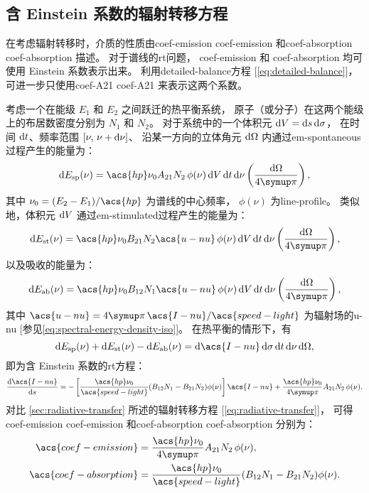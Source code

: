 \subsection{含 Einstein 系数的辐射转移方程}

在考虑辐射转移时，介质的性质由\acl{coef-emission} \acs{coef-emission}
和\acl{coef-absorption} \acs{coef-absorption} 描述。
对于谱线的\ac{rt}问题，
\acs{coef-emission} 和 \acs{coef-absorption} 均可使用 Einstein 系数表示出来。
利用\ac{detailed-balance}方程 [\autoref{eq:detailed-balance}]，
可进一步只使用\acl{coef-A21} \ac{coef-A21} 来表示这两个系数。

考虑一个在能级 $E_1$ 和 $E_2$ 之间跃迁的热平衡系统，
原子（或分子）在这两个能级上的布居数密度分别为 $N_1$ 和 $N_2$。
对于系统中的一个体积元 $\mathrm{d}V = \mathrm{d}s\,\mathrm{d}\sigma$，
在时间 $\mathrm{d}t$、频率范围 $[\nu, \,\nu+\mathrm{d}\nu]$、
沿某一方向的立体角元 $\mathrm{d}\Omega$ 内通过\ac{em-spontaneous}过程产生的能量为：
\begin{equation}
  \D{E_{\R{sp}}(\nu)}
    = \acs{hp} \nu_0 A_{21} N_2 \,\phi(\nu)
      \,\D{V}\,\D{t}\,\D{\nu} \left( \frac{\D{\Omega}}{4\Cpi} \right) ,
\end{equation}
其中 $\nu_0 = (E_2 - E_1) / \acs{hp}$ 为谱线的中心频率，
$\phi(\nu)$ 为\acf{line-profile}。
类似地，体积元 $\mathrm{d}V$ 通过\ac{em-stimulated}过程产生的能量为：
\begin{equation}
  \D{E_{\R{st}}(\nu)}
    = \acs{hp} \nu_0 B_{21} N_2 \acs{u-nu} \,\phi(\nu)
      \,\D{V}\,\D{t}\,\D{\nu} \left( \frac{\D{\Omega}}{4\Cpi} \right) ,
\end{equation}
以及吸收的能量为：
\begin{equation}
  \D{E_{\R{ab}}(\nu)}
    = \acs{hp} \nu_0 B_{12} N_1 \acs{u-nu} \,\phi(\nu)
      \,\D{V}\,\D{t}\,\D{\nu} \left( \frac{\D{\Omega}}{4\Cpi} \right) ,
\end{equation}
其中
$\acs{u-nu} = 4\Cpi\,\acs{I-nu} / \acs{speed-light}$
为辐射场的\acl{u-nu} [参见\autoref{eq:spectral-energy-density-iso}]。
在热平衡的情形下，有
\begin{equation}
  \D{E_{\R{sp}}(\nu)} + \D{E_{\R{st}}(\nu)} - \D{E_{\R{ab}}(\nu)}
    = \D{\acs{I-nu}}\,\D{\sigma}\,\D{t}\,\D{\nu}\,\D{\Omega} ,
\end{equation}
即为含 Einstein 系数的\ac{rt}方程：
\begin{equation}
  \diff{\acs{I-nu}}{s}
    = - \left [ \frac{\acs{hp} \nu_0}{\acs{speed-light}}
      (B_{12} N_1 - B_{21} N_2) \phi(\nu) \right] \acs{I-nu}
      + \frac{\acs{hp} \nu_0}{4\Cpi} A_{21} N_2 \,\phi(\nu) .
\end{equation}
对比 \autoref{sec:radiative-transfer} 所述的辐射转移方程
[\autoref{eq:radiative-transfer}]，
可得\acl{coef-emission} \acs{coef-emission}
和\acl{coef-absorption} \acs{coef-absorption} 分别为：
\begin{align}
  \acs{coef-emission}
    & = \frac{\acs{hp} \nu_0}{4\Cpi} A_{21} N_2 \,\phi(\nu) ,
  \label{eq:coef-emission-einstein} \\
  \acs{coef-absorption}
    & = \frac{\acs{hp} \nu_0}{\acs{speed-light}}
      (B_{12} N_1 - B_{21} N_2) \phi(\nu) .
  \label{eq:coef-absorption-einstein1}
\end{align}


